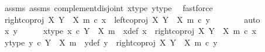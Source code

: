 \begin{isabellebody}
\ assms{\isacharparenleft}{\kern0pt}{}{\isacharparenright}{\kern0pt}\ assms{\isacharparenleft}{\kern0pt}{}{\isacharparenright}{\kern0pt}\ complement{\isacharunderscore}{\kern0pt}disjoint\ x{\isacharprime}{\kern0pt}{\isacharunderscore}{\kern0pt}type\ y{\isacharprime}{\kern0pt}{\isacharunderscore}{\kern0pt}type\ \isamarkupfalse%
\ fastforce\isanewline
\ \ \ \ \isamarkupfalse%
\ \isamarkupfalse%
\ {\isachardoublequoteopen}right{\isacharunderscore}{\kern0pt}coproj\ X\ {\isacharparenleft}{\kern0pt}Y\ {\isasymsetminus}\ {\isacharparenleft}{\kern0pt}X{\isacharcomma}{\kern0pt}\ m{\isacharparenright}{\kern0pt}{\isacharparenright}{\kern0pt}\ {\isasymcirc}\isactrlsub c\ x{\isacharprime}{\kern0pt}\ {\isacharequal}{\kern0pt}\ left{\isacharunderscore}{\kern0pt}coproj\ X\ {\isacharparenleft}{\kern0pt}Y\ {\isasymsetminus}\ {\isacharparenleft}{\kern0pt}X{\isacharcomma}{\kern0pt}\ m{\isacharparenright}{\kern0pt}{\isacharparenright}{\kern0pt}\ {\isasymcirc}\isactrlsub c\ y{\isacharprime}{\kern0pt}{\isachardoublequoteclose}\isanewline
\ \ \ \ \ \ \isamarkupfalse%
\ auto\isanewline
\ \ \isamarkupfalse%
\isanewline
\ \ \ \ \isamarkupfalse%
\ x{\isacharprime}{\kern0pt}\ y{\isacharprime}{\kern0pt}\isanewline
\ \ \ \ \isamarkupfalse%
\ x{\isacharprime}{\kern0pt}{\isacharunderscore}{\kern0pt}type{\isacharcolon}{\kern0pt}\ {\isachardoublequoteopen}x{\isacharprime}{\kern0pt}\ {\isasymin}\isactrlsub c\ Y\ {\isasymsetminus}\ {\isacharparenleft}{\kern0pt}X{\isacharcomma}{\kern0pt}\ m{\isacharparenright}{\kern0pt}{\isachardoublequoteclose}\ \ x{\isacharunderscore}{\kern0pt}def{\isacharcolon}{\kern0pt}\ {\isachardoublequoteopen}x\ {\isacharequal}{\kern0pt}\ right{\isacharunderscore}{\kern0pt}coproj\ X\ {\isacharparenleft}{\kern0pt}Y\ {\isasymsetminus}\ {\isacharparenleft}{\kern0pt}X{\isacharcomma}{\kern0pt}\ m{\isacharparenright}{\kern0pt}{\isacharparenright}{\kern0pt}\ {\isasymcirc}\isactrlsub c\ x{\isacharprime}{\kern0pt}{\isachardoublequoteclose}\isanewline
\ \ \ \ \isamarkupfalse%
\ y{\isacharprime}{\kern0pt}{\isacharunderscore}{\kern0pt}type{\isacharcolon}{\kern0pt}\ {\isachardoublequoteopen}y{\isacharprime}{\kern0pt}\ {\isasymin}\isactrlsub c\ Y\ {\isasymsetminus}\ {\isacharparenleft}{\kern0pt}X{\isacharcomma}{\kern0pt}\ m{\isacharparenright}{\kern0pt}{\isachardoublequoteclose}\ \ y{\isacharunderscore}{\kern0pt}def{\isacharcolon}{\kern0pt}\ {\isachardoublequoteopen}y\ {\isacharequal}{\kern0pt}\ right{\isacharunderscore}{\kern0pt}coproj\ X\ {\isacharparenleft}{\kern0pt}Y\ {\isasymsetminus}\ {\isacharparenleft}{\kern0pt}X{\isacharcomma}{\kern0pt}\ m{\isacharparenright}{\kern0pt}{\isacharparenright}{\kern0pt}\ {\isasymcirc}\isactrlsub c\ y{\isacharprime}{\kern0pt}{\isachardoublequoteclose}\isanewline

\end{isabellebody}
